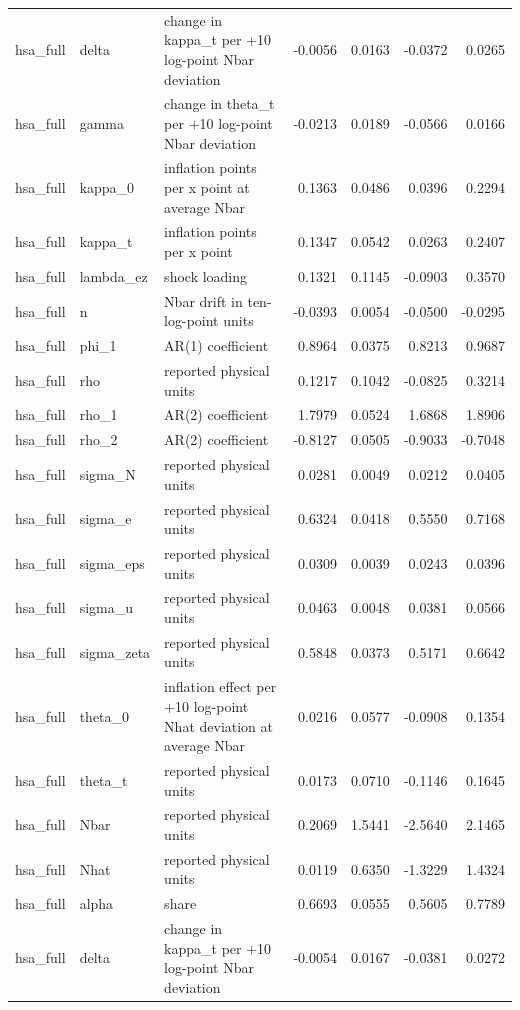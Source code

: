 \begin{tabular}{lllrrrr}
hsa\_full & delta & change in kappa\_t per +10 log-point Nbar deviation & -0.0056 & 0.0163 & -0.0372 & 0.0265 \\
hsa\_full & gamma & change in theta\_t per +10 log-point Nbar deviation & -0.0213 & 0.0189 & -0.0566 & 0.0166 \\
hsa\_full & kappa\_0 & inflation points per x point at average Nbar & 0.1363 & 0.0486 & 0.0396 & 0.2294 \\
hsa\_full & kappa\_t & inflation points per x point & 0.1347 & 0.0542 & 0.0263 & 0.2407 \\
hsa\_full & lambda\_ez & shock loading & 0.1321 & 0.1145 & -0.0903 & 0.3570 \\
hsa\_full & n & Nbar drift in ten-log-point units & -0.0393 & 0.0054 & -0.0500 & -0.0295 \\
hsa\_full & phi\_1 & AR(1) coefficient & 0.8964 & 0.0375 & 0.8213 & 0.9687 \\
hsa\_full & rho & reported physical units & 0.1217 & 0.1042 & -0.0825 & 0.3214 \\
hsa\_full & rho\_1 & AR(2) coefficient & 1.7979 & 0.0524 & 1.6868 & 1.8906 \\
hsa\_full & rho\_2 & AR(2) coefficient & -0.8127 & 0.0505 & -0.9033 & -0.7048 \\
hsa\_full & sigma\_N & reported physical units & 0.0281 & 0.0049 & 0.0212 & 0.0405 \\
hsa\_full & sigma\_e & reported physical units & 0.6324 & 0.0418 & 0.5550 & 0.7168 \\
hsa\_full & sigma\_eps & reported physical units & 0.0309 & 0.0039 & 0.0243 & 0.0396 \\
hsa\_full & sigma\_u & reported physical units & 0.0463 & 0.0048 & 0.0381 & 0.0566 \\
hsa\_full & sigma\_zeta & reported physical units & 0.5848 & 0.0373 & 0.5171 & 0.6642 \\
hsa\_full & theta\_0 & inflation effect per +10 log-point Nhat deviation at average Nbar & 0.0216 & 0.0577 & -0.0908 & 0.1354 \\
hsa\_full & theta\_t & reported physical units & 0.0173 & 0.0710 & -0.1146 & 0.1645 \\
hsa\_full & Nbar & reported physical units & 0.2069 & 1.5441 & -2.5640 & 2.1465 \\
hsa\_full & Nhat & reported physical units & 0.0119 & 0.6350 & -1.3229 & 1.4324 \\
hsa\_full & alpha & share & 0.6693 & 0.0555 & 0.5605 & 0.7789 \\
hsa\_full & delta & change in kappa\_t per +10 log-point Nbar deviation & -0.0054 & 0.0167 & -0.0381 & 0.0272 \\

\end{tabular}
